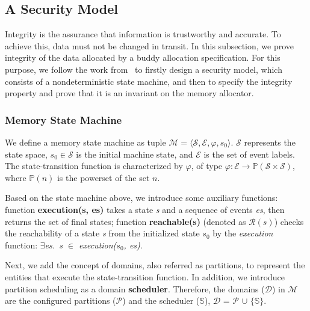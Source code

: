 %
%

\subsection{A Security Model}\label{sec:securitymodel}
Integrity is the assurance that information is trustworthy and accurate. To achieve this, data must not be changed in transit. In this subsection, we prove integrity of  the data allocated by a buddy allocation specification. For this purpose, we follow the work from~\cite{reg_securitymodel} to firstly design a security model, which consists of a nondeterministic state machine, and then to specify the integrity property and prove that it is an invariant on the memory allocator.

\subsubsection{Memory State Machine}
We define a memory state machine as tuple $\mathcal{M} = \langle \mathcal{S}, \mathcal{E}, \varphi, s_0 \rangle$. $\mathcal{S}$ represents the state space,  $s_0 \in \mathcal{S}$ is the initial machine state, and $\mathcal{E}$ is the set of event labels. The state-transition function is characterized by $\varphi$, of type $\varphi: \mathcal{E} \rightarrow \mathbb{P}(\mathcal{S} \times \mathcal{S})$, where $\mathbb{P}(n)$ is the powerset of the set $n$.

Based on the state machine above, we introduce some auxiliary functions: function \textbf{execution(s, es)} takes a state \emph{s} and a sequence of events \emph{es}, then returns the set of final states; function \textbf{reachable(s)} (denoted as $\mathcal{R}(s)$) checks the reachability of a state \emph{s} from the initialized state $s_0$ by the \emph{execution} function: \emph{$\exists$es.\ s $\in$ execution($s_0$, es)}.

Next, we add the concept of domains, also referred as partitions, to represent the entities that execute the state-transition function. In addition, we introduce partition scheduling as a domain \textbf{scheduler}. Therefore, the domains ($\mathcal{D}$) in $\mathcal{M}$ are the configured partitions ($\mathcal{P}$) and the scheduler ($\mathbb{S}$), $\mathcal{D}$ = $\mathcal{P}$ $\cup$ $\lbrace$$\mathbb{S}$$\rbrace$.

